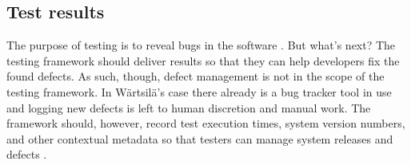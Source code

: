 \documentclass[12pt,a4paper,oneside,pdftex]{report}
\begin{document}
%
\begin{comment} %
Other incremental testing methods include delivery, criticality, or functionality based 
strategies \citep{van2008identifying} where the system connections and hierarchy are built selectively an integration at a time. Further, \citet{carey1977control} discuss build testing. \citet{beizer1984software} introduces a "mixed bag" strategy which combines bottom-up, top-down, big-bang and build testing. 
\end{comment}
%
%
%
%
%
%
%
%

\subsection{Test results}
The purpose of testing is to reveal bugs in the software \citep{burnstein2003practical}. But what's next? The testing framework should deliver results so that they can help developers fix the found defects. As such, though, defect management is not in the scope of the testing framework. In Wärtsilä's case there already is a bug tracker tool in use and logging new defects is left to human discretion and manual work. The framework should, however, record test execution times, system version numbers, and other contextual metadata so that testers can manage system releases and defects \citep{jenkins2008software}.
\end{document}
